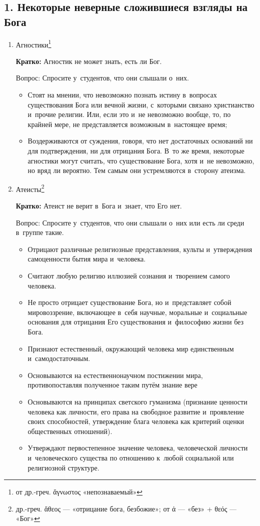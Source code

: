 \documentclass[a4paper,12pt]{article}
\begin{document}
\subsection{1. Некоторые неверные сложившиеся взгляды на Бога}
\begin{enumerate}
    \item Агностики\footnote{от др.-греч. ἄγνωστος «непознаваемый»} 
    
    \textbf{Кратко:} Агностик не может знать, есть ли Бог.
    
    Вопрос: Спросите у~студентов, что они слышали о~них.
    \begin{itemize}
        \item Стоят на мнении, что невозможно познать истину в~вопросах существования Бога или вечной жизни, с~которыми связано христианство и~прочие религии. Или, если это и~не невозможно вообще, то, по крайней мере, не представляется возможным в~настоящее время;
        \item Воздерживаются от суждения, говоря, что нет достаточных оснований ни для подтверждения, ни для отрицания Бога. В~то же время, некоторые агностики могут считать, что существование Бога, хотя и~не невозможно, но вряд ли вероятно. Тем самым они устремляются в~сторону атеизма.
    \end{itemize}

    \item Атеисты\footnote{др.-греч. ἄθεος — «отрицание бога, безбожие»; от ἀ — «без» + θεός — «Бог»} 
    
    \textbf{Кратко:} Атеист не верит в~Бога и~знает, что Его нет.
    
    Вопрос: Спросите у~студентов, что они слышали о~них или есть ли среди в~группе такие.

    \begin{itemize}
        \item Отрицают различные религиозные представления, культы и~утверждения самоценности бытия мира и~человека.
        \item Считают любую религию иллюзией сознания и~творением самого человека.
        \item Не просто отрицает существование Бога, но и~представляет собой мировоззрение, включающее в~себя научные, моральные и~социальные основания для отрицания Его существования и~философию жизни без Бога.
        \item Признают естественный, окружающий человека мир единственным и~самодостаточным.
        \item Основываются на естественнонаучном постижении мира, противопоставляя полученное таким путём знание вере
        \item Основываются на принципах светского гуманизма (признание ценности человека как личности, его права на свободное развитие и~проявление своих способностей, утверждение блага человека как критерий оценки общественных отношений).
        \item Утверждают первостепенное значение человека, человеческой личности и~человеческого существа по отношению к~любой социальной или религиозной структуре.
    \end{itemize}


\end{enumerate}
\end{document}
